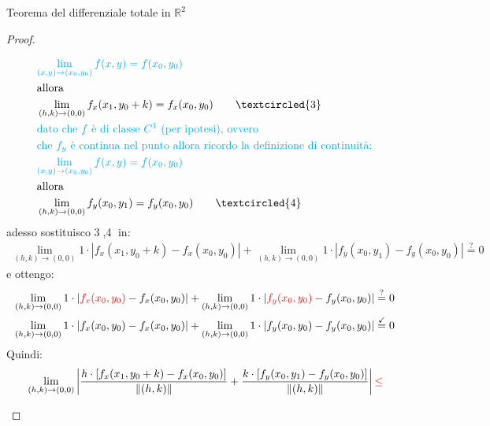 \documentclass{article}  %
\begin{document}
\begin{theorem}{Teorema del differenziale totale in $\mathbb{R}^2$}
\begin{proof}
\begin{enumerate}
\begin{align*}
				       & \textcolor{cyan}{\lim_{(x,y)\to(x_0,y_0)} f(x,y) = f(x_0,y_0)}                                       \\
				       & \text{allora}                                                                                        \\
				       & \lim_{(h,k)\to(0,0)} f_x(x_1,y_0+k) = f_x(x_0,y_0)  \quad \quad \textcircled{3}                      \\
				       & \textcolor{cyan}{\text{dato che $f$ è di classe $C^1$ (per ipotesi), ovvero}}                        \\
				       & \textcolor{cyan}{\text{che $f_y$ è continua nel punto allora ricordo la definizione di continuità:}} \\
				       & \textcolor{cyan}{\lim_{(x,y)\to(x_0,y_0)} f(x,y) = f(x_0,y_0)}                                       \\
				       & \text{allora}                                                                                        \\
				       & \lim_{(h,k)\to(0,0)} f_y(x_0,y_1) = f_y(x_0,y_0)  \quad \quad \textcircled{4}
			      \end{align*}
			      adesso sostituisco \textcircled{3},\textcircled{4} in:
			      \begin{align*}
				      \lim_{(h,k) \to (0,0)} 1 \cdot \left| {f_x(x_1,y_0+k)-f_x(x_0,y_0)} \right|
				      + \lim_{(h,k) \to (0,0)} 1 \cdot \left| {f_y(x_0,y_1)-f_y(x_0,y_0)} \right| \overset{?}{=} 0
			      \end{align*}
			      e ottengo:
			      \begin{align*}
				      \lim_{(h,k) \to (0,0)} 1 \cdot \left| {\textcolor{red}{f_x(x_0,y_0)}-f_x(x_0,y_0)} \right|
				      + \lim_{(h,k) \to (0,0)} 1 \cdot \left| {\textcolor{red}{f_y(x_0,y_0)}-f_y(x_0,y_0)} \right| \overset{?}{=} 0 \\
				      \lim_{(h,k) \to (0,0)} 1 \cdot \left| {{f_x(x_0,y_0)}-f_x(x_0,y_0)} \right|
				      + \lim_{(h,k) \to (0,0)} 1 \cdot \left| {{f_y(x_0,y_0)}-f_y(x_0,y_0)} \right| \overset{{\checkmark}}{=} 0
			      \end{align*}
			      Quindi:
			      \begin{align*}
				       & \lim_{(h,k) \to (0,0)} \left| \frac{h \cdot \left[f_x(x_1,y_0+k)-f_x(x_0,y_0)\right]}{\|(h,k)\|}
				      + \frac{k \cdot \left[f_y(x_0,y_1)-f_y(x_0,y_0)\right]}{\|(h,k)\|} \right|
				      \textcolor{red}{\leq}                                                                                                                          \\

\end{align*}
\end{enumerate}
\end{proof}
\end{theorem}
\end{document}
